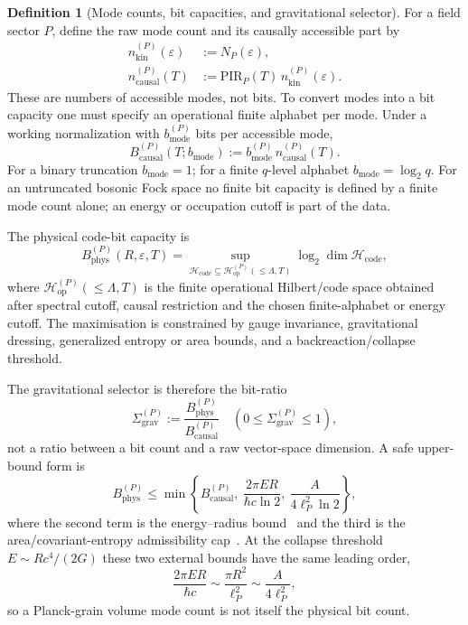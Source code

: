 \documentclass[11pt,a4paper]{article}
\theoremstyle{definition}
\newtheorem{definition}[theorem]{Definition}
\theoremstyle{remark}
\newcommand{\PIR}{\mathrm{PIR}}
\newcommand{\nkin}{n_{\mathrm{kin}}}
\newcommand{\ncausal}{n_{\mathrm{causal}}}
\newcommand{\Bphys}{B_{\mathrm{phys}}}
\newcommand{\Bcausal}{B_{\mathrm{causal}}}
\newcommand{\Bmode}{b_{\mathrm{mode}}}
\begin{document}
\begin{definition}[Mode counts, bit capacities, and gravitational selector]
For a field sector \(P\), define the raw mode count and its causally accessible part by
\begin{align}
\nkin^{(P)}(\varepsilon)&:=N_P(\varepsilon),\\
\ncausal^{(P)}(T)&:=\PIR_P(T)\,\nkin^{(P)}(\varepsilon).
\end{align}
These are numbers of accessible modes, not bits.  To convert modes into a bit capacity one must
specify an operational finite alphabet per mode.  Under a working normalization with
\(\Bmode^{(P)}\) bits per accessible mode,
\begin{equation}
\Bcausal^{(P)}(T;\Bmode):=\Bmode^{(P)}\,\ncausal^{(P)}(T).
\end{equation}
For a binary truncation \(\Bmode=1\); for a finite \(q\)-level alphabet
\(\Bmode=\log_2 q\).  For an untruncated bosonic Fock space no finite bit capacity is defined
by a finite mode count alone; an energy or occupation cutoff is part of the data.

The physical code-bit capacity is
\begin{equation}
\Bphys^{(P)}(R,\varepsilon,T)
=\sup_{\mathcal H_{\mathrm{code}}\subseteq \mathcal H_{\mathrm{op}}^{(P)}(\le\Lambda,T)}
\log_2\dim\mathcal H_{\mathrm{code}},
\end{equation}
where \(\mathcal H_{\mathrm{op}}^{(P)}(\le\Lambda,T)\) is the finite operational Hilbert/code
space obtained after spectral cutoff, causal restriction and the chosen finite-alphabet or
energy cutoff.  The maximisation is constrained by gauge invariance, gravitational dressing,
generalized entropy or area bounds, and a backreaction/collapse threshold.

The gravitational selector is therefore the bit-ratio
\begin{equation}
\Sigma_{\mathrm{grav}}^{(P)}:=
\frac{\Bphys^{(P)}}{\Bcausal^{(P)}}\quad
(0\le\Sigma_{\mathrm{grav}}^{(P)}\le1),
\end{equation}
not a ratio between a bit count and a raw vector-space dimension.  A safe upper-bound form is
\begin{equation}
\Bphys^{(P)}\le
\min\left\{
\Bcausal^{(P)},\ \frac{2\pi E R}{\hbar c\ln2},\ \frac{A}{4\ell_P^2\ln2}
\right\},
\label{eq:bit-safe-bound}
\end{equation}
where the second term is the energy--radius bound~\cite{Bekenstein1981} and the third is the
area/covariant-entropy admissibility cap~\cite{Bousso1999,RyuTakayanagi2006,EngelhardtWall2015}.  At the collapse threshold
\(E\sim Rc^4/(2G)\) these two external bounds have the same leading order,
\begin{equation}
\frac{2\pi E R}{\hbar c}\sim\frac{\pi R^2}{\ell_P^2}\sim \frac{A}{4\ell_P^2},
\end{equation}
so a Planck-grain volume mode count is not itself the physical bit count.


\end{definition}
\end{document}
